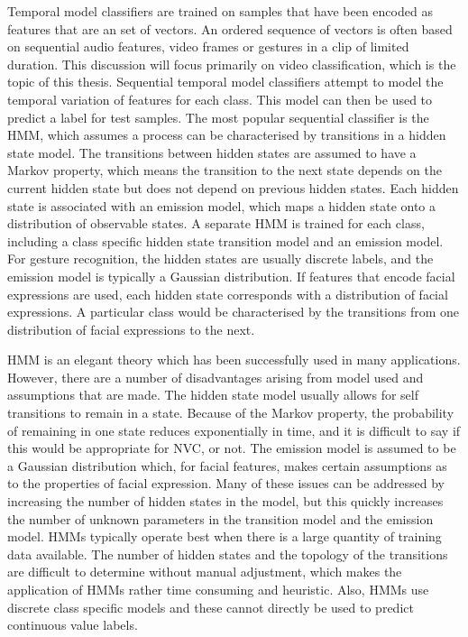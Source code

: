 Temporal model classifiers are trained on samples that have been encoded as features that are an set of vectors. An ordered sequence of vectors is often based on sequential audio features, video frames or gestures in a clip of limited duration. This discussion will focus primarily on video classification, which is the topic of this thesis. Sequential temporal model classifiers attempt to model the temporal variation of features for each class. This model can then be used to predict a label for test samples. The most popular sequential classifier is the \acf{HMM}, which assumes a process can be characterised by transitions in a hidden state model. The transitions between hidden states are assumed to have a Markov property, which means the transition to the next state depends on the current hidden state but does not depend on previous hidden states. Each hidden state is associated with an emission model, which maps a hidden state onto a distribution of observable states. A separate \ac{HMM} is trained for each class, including a class specific hidden state transition model and an emission model. For gesture recognition, the hidden states are usually discrete labels, and the emission model is typically a Gaussian distribution. If features that encode facial expressions are used, each hidden state corresponds with a distribution of facial expressions. A particular class would be characterised by the transitions from one distribution of facial expressions to the next. 

\ac{HMM} is an elegant theory which has been successfully used in many applications. However, there are a number of disadvantages arising from model used and assumptions that are made. The hidden state model usually allows for self transitions to remain in a state. Because of the Markov property, the probability of remaining in one state reduces exponentially in time, and it is difficult to say if this would be appropriate for \ac{NVC}, or not. The emission model is assumed to be a Gaussian distribution which, for facial features, makes certain assumptions as to the properties of facial expression. Many of these issues can be addressed by increasing the number of hidden states in the model, but this quickly increases the number of unknown parameters in the transition model and the emission model. \ac{HMM}s typically operate best when there is a large quantity of training data available. The number of hidden states and the topology of the transitions are difficult to determine without manual adjustment, which makes the application of \ac{HMM}s rather time consuming and heuristic. Also, \ac{HMM}s use discrete class specific models and these cannot directly be used to predict continuous value labels.

